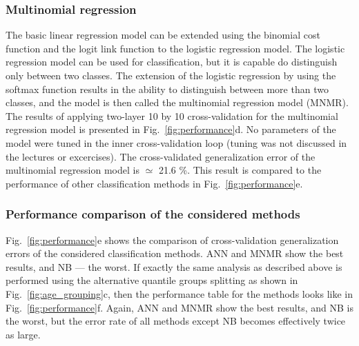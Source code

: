 \documentclass[10pt, paper=a4]{article}
\begin{document}
\subsubsection{Multinomial regression}  %
The basic linear regression model can be extended using the binomial
cost function and the logit link function to the logistic regression
model.  The logistic regression model can be used for classification,
but it is capable do distinguish only between two classes.  The
extension of the logistic regression by using the softmax function
results in the ability to distinguish between more than two classes,
and the model is then called the multinomial regression model (MNMR).
The results of applying two-layer 10 by 10 cross-validation for the
multinomial regression model is presented in
Fig.~\ref{fig:performance}d.  No parameters of the model were tuned in
the inner cross-validation loop (tuning was not discussed in the
lectures or excercises).  The cross-validated generalization error of
the multinomial regression model is $\simeq$ 21.6 \%.  This result is
compared to the performance of other classification methods in
Fig.~\ref{fig:performance}e.

\subsubsection{Performance comparison of the considered methods}
Fig.~\ref{fig:performance}e shows the comparison of cross-validation
generalization errors of the considered classification methods.  ANN
and MNMR show the best results, and NB --- the worst.  If exactly the
same analysis as described above is performed using the alternative
quantile groups splitting as shown in Fig.~\ref{fig:age_grouping}c,
then the performance table for the methods looks like in
Fig.~\ref{fig:performance}f.  Again, ANN and MNMR show the best
results, and NB is the worst, but the error rate of all methods except
NB becomes effectively twice as large.
\end{document}
